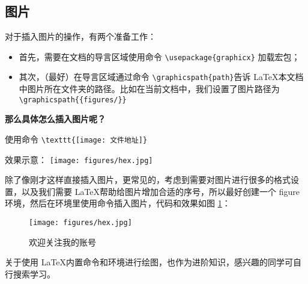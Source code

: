 
\subsection{图片}
对于插入图片的操作，有两个准备工作：
\begin{itemize}
    \item 首先，需要在文档的导言区域使用命令 \verb|\usepackage{graphicx}| 加载宏包；
    \item 其次，（最好）在导言区域通过命令 \verb|\graphicspath{path}|告诉 \LaTeX  本文档中图片所在文件夹的路径。比如在当前文档中，我们设置了图片路径为 \verb|\graphicspath{{figures/}}|
\end{itemize}


\vspace{1em}
\textbf{那么具体怎么插入图片呢？} \par
使用命令 \verb|\texttt{[image: 文件地址]}| \par

效果示意：\newline
\texttt{[image: figures/hex.jpg]} 


除了像刚才这样直接插入图片，更常见的，考虑到需要对图片进行很多的格式设置，以及我们需要 \LaTeX 帮助给图片增加合适的序号，所以最好创建一个 figure 环境，然后在环境里使用命令插入图片，代码和效果如图 \ref{fig:hex}：\par

\begin{figure}
    \centering
    \texttt{[image: figures/hex.jpg]} 
    \caption{欢迎关注我的账号}
    \label{fig:hex}
\end{figure}


关于使用 \LaTeX 内置命令和环境进行绘图，也作为进阶知识，感兴趣的同学可自行搜索学习。

